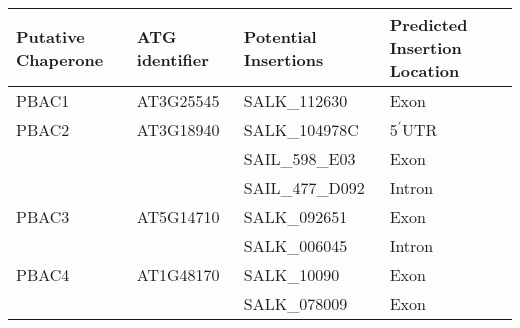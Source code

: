\begin{tabular}{@{}llll@{}}
\toprule
Putative Chaperone & ATG identifier & Potential Insertions & Predicted Insertion Location \\ \midrule
PBAC1              & AT3G25545      & SALK\_112630         & Exon                         \\
PBAC2              & AT3G18940      & SALK\_104978C        & 5$^{\prime}$UTR                        \\
                   &                & SAIL\_598\_E03       & Exon                         \\
                   &                & SAIL\_477\_D092      & Intron                       \\
PBAC3              & AT5G14710      & SALK\_092651         & Exon                         \\
                   &                & SALK\_006045         & Intron                       \\
PBAC4              & AT1G48170      & SALK\_10090          & Exon                         \\
                   &                & SALK\_078009         & Exon                         \\ \bottomrule
\end{tabular}